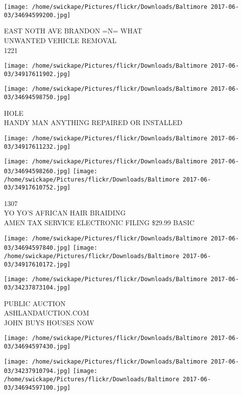 \documentclass[10pt,letterpaper]{article}
\begin{document}
\vspace{0.25in}
\texttt{[image: /home/swickape/Pictures/flickr/Downloads/Baltimore 2017-06-03/34694599200.jpg]}

EAST NOTH AVE BRANDON =N= WHAT\\
UNWANTED VEHICLE REMOVAL\\
1221
\pagebreak

\texttt{[image: /home/swickape/Pictures/flickr/Downloads/Baltimore 2017-06-03/34917611902.jpg]}

\vspace{0.25in}
\texttt{[image: /home/swickape/Pictures/flickr/Downloads/Baltimore 2017-06-03/34694598750.jpg]}

HOLE\\
HANDY MAN ANYTHING REPAIRED OR INSTALLED
\pagebreak

\texttt{[image: /home/swickape/Pictures/flickr/Downloads/Baltimore 2017-06-03/34917611232.jpg]}

\vspace{0.25in}
\texttt{[image: /home/swickape/Pictures/flickr/Downloads/Baltimore 2017-06-03/34694598260.jpg]}
\texttt{[image: /home/swickape/Pictures/flickr/Downloads/Baltimore 2017-06-03/34917610752.jpg]}

1307\\
YO YO'S AFRICAN HAIR BRAIDING\\
AMEN TAX SERVICE ELECTRONIC FILING \$29.99 BASIC
\pagebreak

\texttt{[image: /home/swickape/Pictures/flickr/Downloads/Baltimore 2017-06-03/34694597840.jpg]}
\texttt{[image: /home/swickape/Pictures/flickr/Downloads/Baltimore 2017-06-03/34917610172.jpg]}

\texttt{[image: /home/swickape/Pictures/flickr/Downloads/Baltimore 2017-06-03/34237873104.jpg]}

PUBLIC AUCTION\\
ASHLANDAUCTION.COM\\
JOHN BUYS HOUSES NOW
\pagebreak

\texttt{[image: /home/swickape/Pictures/flickr/Downloads/Baltimore 2017-06-03/34694597430.jpg]}

\vspace{0.25in}
\texttt{[image: /home/swickape/Pictures/flickr/Downloads/Baltimore 2017-06-03/34237910794.jpg]}
\texttt{[image: /home/swickape/Pictures/flickr/Downloads/Baltimore 2017-06-03/34694597100.jpg]}
\end{document}
